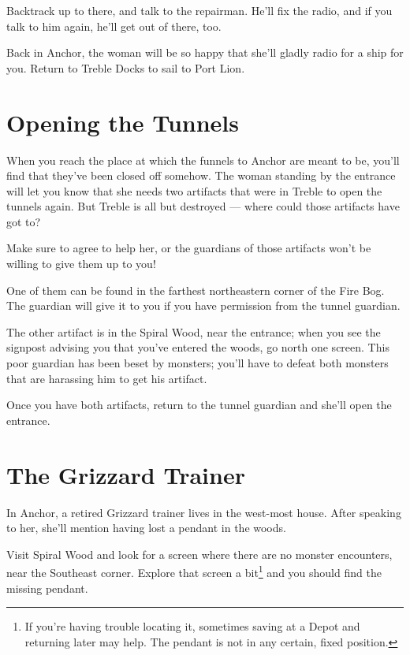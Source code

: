 \documentclass[10pt,twocolumn]{memoir}
\begin{document}
Backtrack up to  there, and talk to the repairman.  He'll fix the radio,
and if you talk to him again, he'll get out of there, too.

Back in Anchor, the woman will be  so happy that she'll gladly radio for
a ship for you. Return to Treble Docks to sail to Port Lion.

\section{Opening the Tunnels}

When you reach the place at which the funnels to Anchor are meant to be,
you'll find that they've been closed  off somehow. The woman standing by
the entrance will let you know that she needs two artifacts that were in
Treble to  open the tunnels again.  But Treble is all  but destroyed ---
where could those artifacts have got to?

Make sure  to agree  to help  her, or the  guardians of  those artifacts
won't be willing to give them up to you!

One of  them can  be found  in the farthest  northeastern corner  of the
Fire Bog. The guardian  will give it to you if  you have permission from
the tunnel guardian.

The other  artifact is in the  Spiral Wood, near the  entrance; when you
see the  signpost advising you that  you've entered the woods,  go north
one screen. This  poor guardian has been beset by  monsters; you'll have
to defeat both monsters that are harassing him to get his artifact.

Once you have  both artifacts, return to the tunnel  guardian and she'll
open the entrance.

\section{The Grizzard Trainer}

In  Anchor, a  retired Grizzard  trainer lives  in the  west-most house.
After  speaking  to  her,  she'll  mention  having  lost  a  pendant  in
the woods.

Visit  Spiral Wood  and look  for a  screen where  there are  no monster
encounters,   near   the   Southeast   corner.   Explore   that   screen
a bit\footnote{If you're having trouble locating it, sometimes saving at
  a  Depot and  returning later  may  help. The  pendant is  not in  any
  certain, fixed position.} and you should find the missing pendant.
\end{document}
